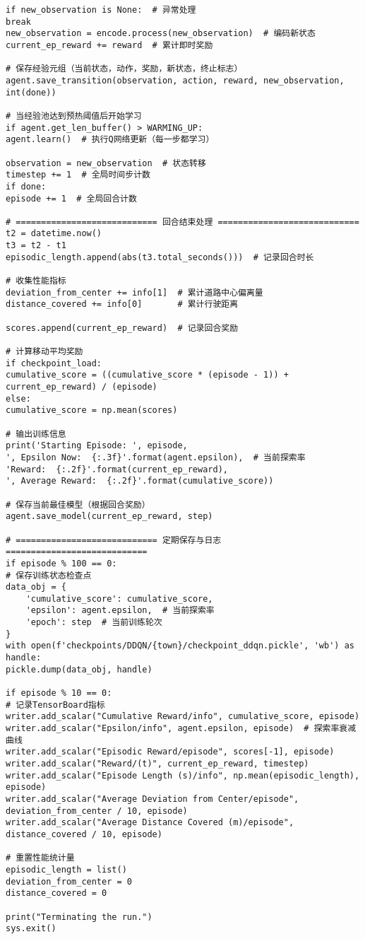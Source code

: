 \begin{lstlisting}
if new_observation is None:  # 异常处理
break
new_observation = encode.process(new_observation)  # 编码新状态
current_ep_reward += reward  # 累计即时奖励

# 保存经验元组（当前状态，动作，奖励，新状态，终止标志）
agent.save_transition(observation, action, reward, new_observation, int(done))

# 当经验池达到预热阈值后开始学习
if agent.get_len_buffer() > WARMING_UP:
agent.learn()  # 执行Q网络更新（每一步都学习）

observation = new_observation  # 状态转移
timestep += 1  # 全局时间步计数
if done:
episode += 1  # 全局回合计数

# ============================ 回合结束处理 ============================
t2 = datetime.now()
t3 = t2 - t1
episodic_length.append(abs(t3.total_seconds()))  # 记录回合时长

# 收集性能指标
deviation_from_center += info[1]  # 累计道路中心偏离量
distance_covered += info[0]       # 累计行驶距离

scores.append(current_ep_reward)  # 记录回合奖励

# 计算移动平均奖励
if checkpoint_load:
cumulative_score = ((cumulative_score * (episode - 1)) + current_ep_reward) / (episode)
else:
cumulative_score = np.mean(scores)

# 输出训练信息
print('Starting Episode: ', episode, 
', Epsilon Now:  {:.3f}'.format(agent.epsilon),  # 当前探索率
'Reward:  {:.2f}'.format(current_ep_reward), 
', Average Reward:  {:.2f}'.format(cumulative_score))

# 保存当前最佳模型（根据回合奖励）
agent.save_model(current_ep_reward, step)

# ============================ 定期保存与日志 ============================
if episode % 100 == 0:
# 保存训练状态检查点
data_obj = {
	'cumulative_score': cumulative_score,
	'epsilon': agent.epsilon,  # 当前探索率
	'epoch': step  # 当前训练轮次
}
with open(f'checkpoints/DDQN/{town}/checkpoint_ddqn.pickle', 'wb') as handle:
pickle.dump(data_obj, handle)

if episode % 10 == 0:
# 记录TensorBoard指标
writer.add_scalar("Cumulative Reward/info", cumulative_score, episode)
writer.add_scalar("Epsilon/info", agent.epsilon, episode)  # 探索率衰减曲线
writer.add_scalar("Episodic Reward/episode", scores[-1], episode)
writer.add_scalar("Reward/(t)", current_ep_reward, timestep)
writer.add_scalar("Episode Length (s)/info", np.mean(episodic_length), episode)
writer.add_scalar("Average Deviation from Center/episode", deviation_from_center / 10, episode)
writer.add_scalar("Average Distance Covered (m)/episode", distance_covered / 10, episode)

# 重置性能统计量
episodic_length = list()
deviation_from_center = 0
distance_covered = 0

print("Terminating the run.")
sys.exit()

\end{lstlisting}

